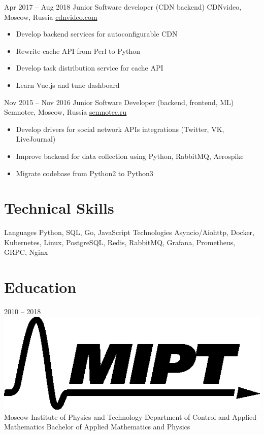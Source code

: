 \documentclass[11pt,a4paper]{moderncv}
\begin{document}
  \cventry
    {Apr 2017 – Aug 2018}
    {Junior Software developer (CDN backend)}
    {CDNvideo, Moscow, Russia}
    {\url{cdnvideo.com}}
    {}
    {
      \begin{itemize}\setlength\itemindent{6pt}
        \item Develop backend services for autoconfigurable CDN
        \item Rewrite cache API from Perl to Python
        \item Develop task distribution service for cache API
        \item Learn Vue.js and tune dashboard
      \end{itemize}
    }

  \cventry
    {Nov 2015 – Nov 2016}
    {Junior Software Developer (backend, frontend, ML)}
    {Semnotec, Moscow, Russia}
    {\url{semnotec.ru}}
    {}
    {
      \begin{itemize}\setlength\itemindent{6pt}
        \item Develop drivers for social network APIs integrations (Twitter, VK, LiveJournal)
        \item Improve backend for data collection using Python, RabbitMQ, Aerospike
        \item Migrate codebase from Python2 to Python3
      \end{itemize}
    }

\section{Technical Skills}
  \cvline
    {Languages}{
      Python,
      SQL,
      Go,
      JavaScript
    }
  \cvline
    {Technologies}{
      Asyncio/Aiohttp,
      Docker,
      Kubernetes,
      Linux,
      PostgreSQL,
      Redis,
      RabbitMQ,
      Grafana,
      Prometheus,
      GRPC,
      Nginx
    }

\section{Education}
  \vspace*{-5mm}
  \cventry
    {2010 – 2018}
    {\includegraphics[scale=0.25]{assets/mipt} Moscow Institute of Physics and Technology}
    {}
    {}{}
    {
      Department of Control and Applied Mathematics \newline{}
      Bachelor of Applied Mathematics and Physics \newline{}
    }
    {}
\end{document}
